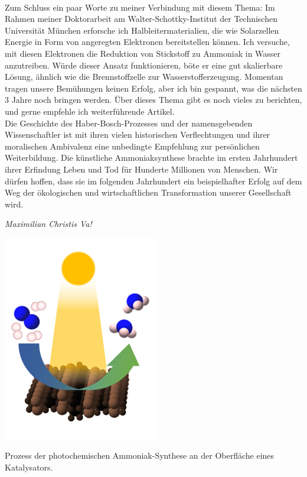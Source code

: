 \begin{multicols}{2}
\\
Zum Schluss ein paar Worte zu meiner Verbindung mit diesem Thema: Im Rahmen meiner Doktorarbeit am Walter-Schottky-Institut der Technischen Universität München erforsche ich Halbleitermaterialien, die wie Solarzellen Energie in Form von angeregten Elektronen bereitstellen können. Ich versuche, mit diesen Elektronen die Reduktion von Stickstoff zu Ammoniak in Wasser anzutreiben. Würde dieser Ansatz funktionieren, böte er eine gut skalierbare Lösung, ähnlich wie die Brennstoffzelle zur Wasserstofferzeugung. Momentan tragen unsere Bemühungen keinen Erfolg, aber ich bin gespannt, was die nächsten 3 Jahre noch bringen werden. Über dieses Thema gibt es noch vieles zu berichten, und gerne empfehle ich weiterführende Artikel.
\\
Die Geschichte des Haber-Bosch-Prozesses und der namensgebenden Wissenschaftler ist mit ihren vielen historischen Verflechtungen und ihrer moralischen Ambivalenz eine unbedingte Empfehlung zur persönlichen Weiterbildung. Die künstliche Ammoniaksynthese brachte im ersten Jahrhundert ihrer Erfindung Leben und Tod für Hunderte Millionen von Menschen. Wir dürfen hoffen, dass sie im folgenden Jahrhundert ein beispielhafter Erfolg auf dem Weg der ökologischen und wirtschaftlichen Transformation unserer Gesellschaft wird.
\\
\begin{flushright}
		\hfill\emph{Maximilian Christis Va!}
	\end{flushright}
		
\end{multicols}


\begin{figurehere}
	\begin{center}
		\includegraphics[width=.4\linewidth]{./Bilder/2.0.Stickstoff_Reduktion/Bild1.png} \caption{Prozess der photochemischen Ammoniak-Synthese an der Oberfläche eines Katalysators.} 
	\end{center}
\end{figurehere}



